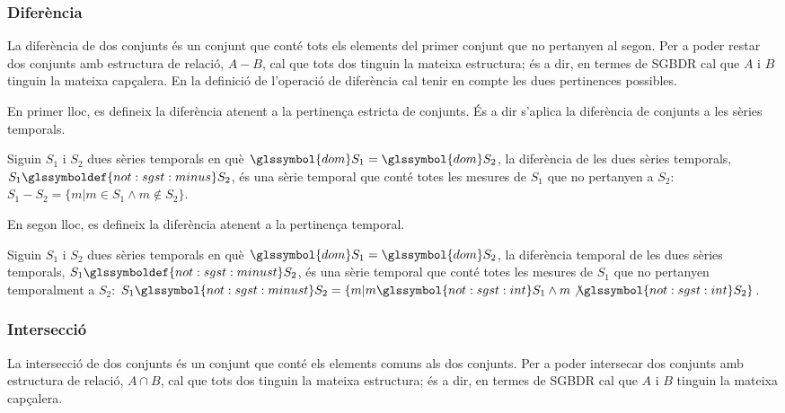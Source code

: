 \subsubsection{Diferència}

La diferència de dos conjunts és un conjunt que conté tots els
elements del primer conjunt que no pertanyen al segon.  Per a poder
restar dos conjunts amb estructura de relació, $A - B$, cal que tots
dos tinguin la mateixa estructura; és a dir, en termes de \gls{SGBDR}
cal que $A$ i $B$ tinguin la mateixa capçalera.
En la definició de l'operació de diferència cal tenir en compte les
dues pertinences possibles.

En primer lloc, es defineix la diferència atenent a la pertinença
estricta de conjunts. És a dir s'aplica la diferència de
conjunts a les sèries temporals.
\begin{definition}[Diferència]
  Siguin $S_1$ i $S_2$ dues sèries temporals  en què $\glssymbol{dom}
  S_1 = \glssymbol{dom} S_2$, la diferència de les dues sèries
  temporals, $S_1 \glssymboldef{not:sgst:minus} S_2$, és una sèrie
  temporal que conté totes les mesures de
  $S_1$ que no pertanyen a $S_2$: $S_1 - S_2 = \{ m| m \in S_1 \wedge m \notin
  S_2 \}$.
\end{definition}

En segon lloc, es defineix la diferència atenent a la pertinença
temporal.
\begin{definition}
  Siguin $S_1$ i $S_2$ dues sèries temporals en què $\glssymbol{dom}
  S_1 = \glssymbol{dom} S_2$, la diferència temporal de les dues
  sèries temporals, $S_1 \glssymboldef{not:sgst:minust} S_2$, és una
  sèrie temporal que conté totes les mesures de $S_1$ que no pertanyen
  temporalment a $S_2$: $S_1 \glssymbol{not:sgst:minust} S_2 = \{ m |
  m \glssymbol{not:sgst:int} S_1 \wedge m \not\glssymbol{not:sgst:int}
  S_2 \}$.
\end{definition}




\subsubsection{Intersecció}

La intersecció de dos conjunts és un conjunt que conté els elements
comuns als dos conjunts.  Per a poder intersecar dos conjunts amb estructura
de relació, $A \cap B$, cal que tots dos tinguin la mateixa
estructura; és a dir, en termes de \gls{SGBDR} cal que $A$ i $B$ tinguin la
mateixa capçalera.

